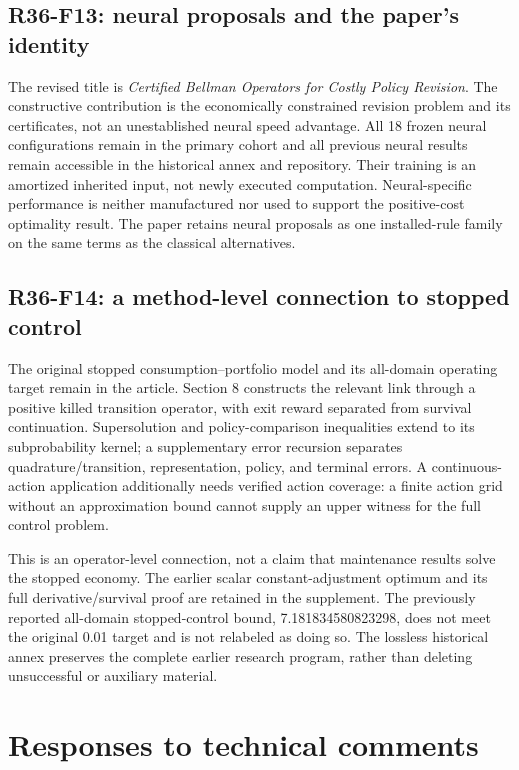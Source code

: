 \subsection{R36-F13: neural proposals and the paper's identity}
The revised title is \emph{Certified Bellman Operators for Costly Policy Revision}. The constructive contribution is the economically constrained revision problem and its certificates, not an unestablished neural speed advantage. All 18 frozen neural configurations remain in the primary cohort and all previous neural results remain accessible in the historical annex and repository. Their training is an amortized inherited input, not newly executed computation. Neural-specific performance is neither manufactured nor used to support the positive-cost optimality result. The paper retains neural proposals as one installed-rule family on the same terms as the classical alternatives.

\subsection{R36-F14: a method-level connection to stopped control}
The original stopped consumption--portfolio model and its all-domain operating target remain in the article. Section 8 constructs the relevant link through a positive killed transition operator, with exit reward separated from survival continuation. Supersolution and policy-comparison inequalities extend to its subprobability kernel; a supplementary error recursion separates quadrature/transition, representation, policy, and terminal errors. A continuous-action application additionally needs verified action coverage: a finite action grid without an approximation bound cannot supply an upper witness for the full control problem.

This is an operator-level connection, not a claim that maintenance results solve the stopped economy. The earlier scalar constant-adjustment optimum and its full derivative/survival proof are retained in the supplement. The previously reported all-domain stopped-control bound, 7.181834580823298, does not meet the original 0.01 target and is not relabeled as doing so. The lossless historical annex preserves the complete earlier research program, rather than deleting unsuccessful or auxiliary material.

\section{Responses to technical comments}
